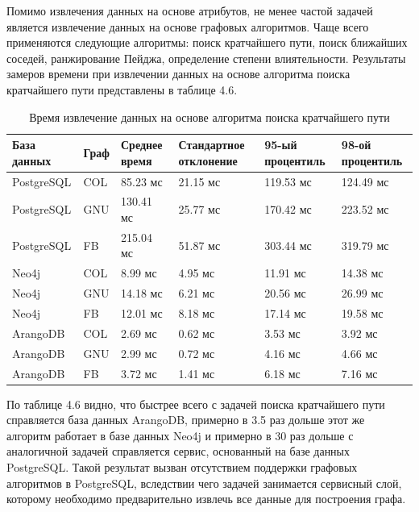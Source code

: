 Помимо извлечения данных на основе атрибутов, не менее частой задачей является извлечение данных на основе графовых алгоритмов. Чаще всего
применяются следующие алгоритмы: поиск кратчайшего пути, поиск ближайших соседей, ранжирование Пейджа, определение степени влиятельности.
Результаты замеров времени при извлечении данных на основе алгоритма поиска кратчайшего пути представлены в таблице 4.6.

\begin{table} [htbp]
    \centering\small
    \caption{Время извлечение данных на основе алгоритма поиска кратчайшего пути}
    \begin{tabular}{|p{3cm}|p{1cm}|p{2cm}|p{2cm}|p{2cm}|p{2cm}|}
        \hline
        База данных & Граф & Среднее время & Стандартное отклонение & 95-ый процентиль & 98-ой процентиль \\ \hline
        PostgreSQL  & COL  & 85.23 мс      & 21.15 мс               & 119.53 мс        & 124.49 мс        \\ \hline
        PostgreSQL  & GNU  & 130.41 мс     & 25.77 мс               & 170.42 мс        & 223.52 мс        \\ \hline
        PostgreSQL  & FB   & 215.04 мс     & 51.87 мс               & 303.44 мс        & 319.79 мс        \\ \hline
        Neo4j       & COL  & 8.99 мс       & 4.95 мс                & 11.91 мс         & 14.38 мс         \\ \hline
        Neo4j       & GNU  & 14.18 мс      & 6.21 мс                & 20.56 мс         & 26.99 мс         \\ \hline
        Neo4j       & FB   & 12.01 мс      & 8.18 мс                & 17.14 мс         & 19.58 мс         \\ \hline
        ArangoDB    & COL  & 2.69 мс       & 0.62 мс                & 3.53 мс          & 3.92 мс          \\ \hline
        ArangoDB    & GNU  & 2.99 мс       & 0.72 мс                & 4.16 мс          & 4.66 мс          \\ \hline
        ArangoDB    & FB   & 3.72 мс       & 1.41 мс                & 6.18 мс          & 7.16 мс          \\ \hline
    \end{tabular}
    \normalsize
\end{table}

По таблице 4.6 видно, что быстрее всего с задачей поиска кратчайшего пути справляется база данных ArangoDB, примерно в 3.5 раз дольше этот
же алгоритм работает в базе данных Neo4j и примерно в 30 раз дольше с аналогичной задачей справляется сервис, основанный на базе данных
PostgreSQL. Такой результат вызван отсутствием поддержки графовых алгоритмов в PostgreSQL, вследствии чего задачей занимается сервисный
слой, которому необходимо предварительно извлечь все данные для построения графа.

